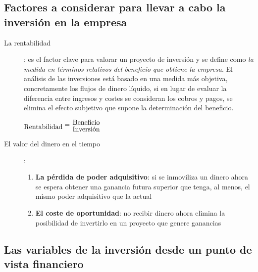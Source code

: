 \documentclass[10pt,a4paper,spanish]{report}
\begin{document}
        \subsection{\textcolor[rgb]{0.4,0.7,0.4}Factores a considerar para llevar a cabo la inversión en la empresa}

            \begin{description}
                  \item[La rentabilidad]:  es el factor clave para valorar un proyecto de inversión y se define como \textit{\textcolor[rgb]{0.4,0.7,0.4}{la medida en términos relativos del beneficio que obtiene la empresa}}. El análisis de las inversiones está basado en una medida más objetiva, concretamente los flujos de dinero líquido, si en lugar de evaluar la diferencia entre ingresos y costes se consideran los cobros y pagos, se elimina el efecto subjetivo que supone la determinación del beneficio.
                  \begin{center}
                        $\txt{Rentabilidad} = \frac{\txt{Beneficio}}{\txt{Inversión}}$
                  \end{center}

                  \item[El valor del dinero en el tiempo]:
                  \begin{enumerate}
                        \item \textbf{La pérdida de poder adquisitivo}: si se inmoviliza un dinero ahora se espera obtener una ganancia futura superior que tenga, al menos, el mismo poder adquisitivo que la actual
                        \item \textbf{El coste de oportunidad}: no recibir dinero ahora elimina la posibilidad de invertirlo en un proyecto que genere ganancias
                  \end{enumerate}
            \end{description}

      \subsection{\textcolor[rgb]{0.4,0.7,0.4}Las variables de la inversión desde un punto de vista financiero}
\end{document}
